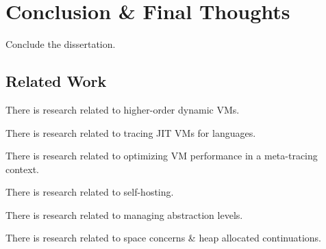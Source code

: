 \chapter{Conclusion \& Final Thoughts}

    \begin{chapterpoint}
        Conclude the dissertation.
    \end{chapterpoint}

    \section{Related Work}

        \begin{mainpoint}
            There is research related to higher-order dynamic VMs.

            There is research related to tracing JIT VMs for languages.

            There is research related to optimizing VM performance in a meta-tracing context.

            There is research related to self-hosting.

            There is research related to managing abstraction levels.

            There is research related to space concerns \& heap allocated continuations.

        \end{mainpoint}

